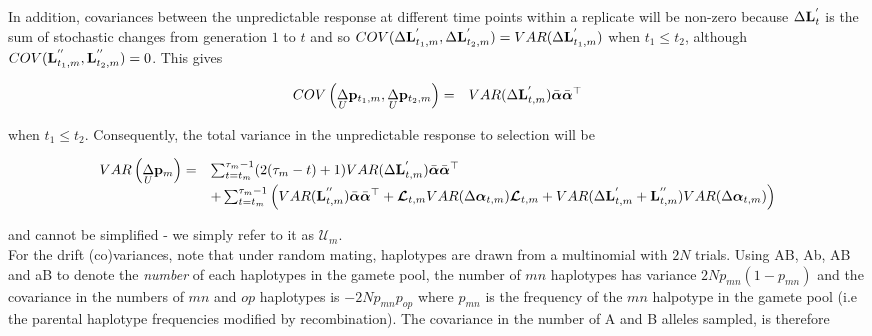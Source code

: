\documentclass[12pt]{article}
\begin{document}
\begin{bibunit}
In addition, covariances between the unpredictable response at different time points within a replicate will be non-zero because $\Delta {\bf L}^{'}_t$ is the sum of stochastic changes from generation $1$ to $t$ and so $COV(\Delta {\bf L}^{'}_{t_1, m}, \Delta {\bf L}^{'}_{t_2, m})=VAR(\Delta {\bf L}^{'}_{t_1, m})$ when $t_1\leq t_2$, although $COV({\bf L}^{''}_{t_1, m}, {\bf L}^{''}_{t_2, m})=0$. This gives


\begin{tiny}
\begin{equation}
\begin{array}{rl}
COV\left(\underset{U}\Delta {\bf p}_{t_1, m}, \underset{U}\Delta {\bf p}_{t_2, m}\right)=
&VAR(\Delta{\bf L}^{'}_{t, m})\bar{\boldsymbol{\alpha}}\bar{\boldsymbol{\alpha}}^{\top}\\
\end{array}
\end{equation}
\end{tiny}

when $t_1\leq t_2$. Consequently, the total variance in the unpredictable response to selection will be

\begin{tiny}
\begin{equation}
\begin{array}{rl}
VAR\left(\underset{U}\Delta {\bf p}_{m}\right)=
&\sum_{t=t_m}^{\tau_m-1}(2(\tau_m-t)+1)VAR(\Delta{\bf L}^{'}_{t, m})\bar{\boldsymbol{\alpha}}\bar{\boldsymbol{\alpha}}^{\top}\\
&+\sum_{t=t_m}^{\tau_m-1}\left(VAR({\bf L}^{''}_{t, m})\bar{\boldsymbol{\alpha}}\bar{\boldsymbol{\alpha}}^{\top}+\boldsymbol{\mathcal L}_{t,m}VAR(\Delta\boldsymbol{\alpha}_{t,m})\boldsymbol{\mathcal L}_{t,m}+VAR(\Delta{\bf L}^{'}_{t,m}+{\bf L}^{''}_{t,m})VAR(\Delta\boldsymbol{\alpha}_{t, m})\right)\\
\end{array}
\end{equation}
\end{tiny}

and cannot be simplified - we simply refer to it as $\boldsymbol{\mathcal{U}}_m$.\\

For the drift (co)variances, note that under random mating, haplotypes are drawn from a multinomial with $2N$ trials. Using AB, Ab, AB and aB to denote the \emph{number} of each haplotypes in the gamete pool, the number of $mn$ haplotypes has variance $2Np_{mn}(1-p_{mn})$ and the covariance in the numbers of $mn$ and $op$ haplotypes is $-2Np_{mn}p_{op}$ where $p_{mn}$ is the frequency of the $mn$ halpotype in the gamete pool (i.e the parental haplotype frequencies modified by recombination). The covariance in the number of A and B alleles sampled, is therefore 



\end{bibunit}
\end{document}
